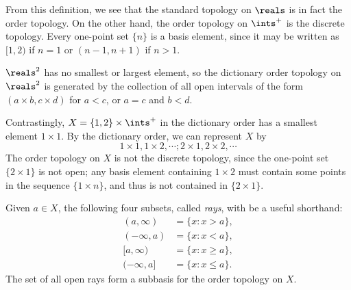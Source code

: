 From this definition, we see that the standard topology on $\reals$ is in fact the order topology. On the other hand, the order topology on $\ints^+$ is the discrete topology. Every one-point set $\{n\}$ is a basis element, since it may be written as $[1, 2)$ if $n = 1$ or $(n-1, n+1)$ if $n>1.$

$\reals^2$ has no smallest or largest element, so the dictionary order topology on $\reals^2$ is generated by the collection of all open intervals of the form $(a \times b, c \times d)$ for $a < c$, or $a = c$ and $b < d$.

Contrastingly, $X = \{1, 2\} \times \ints^+$ in the dictionary order has a smallest element $1 \times 1.$ By the dictionary order, we can represent $X$ by
$$1 \times 1, 1 \times 2, \cdots; 2 \times 1, 2 \times 2, \cdots$$
The order topology on $X$ is not the discrete topology, since the one-point set $\{2\times 1\}$ is not open; any basis element containing $1\times 2$ must contain some points in the sequence $\{1 \times n\}$, and thus is not contained in $\{2\times 1\}$.

Given $a \in X$, the following four subsets, called {\it rays}, with be a useful shorthand:
\begin{align*}
    (a, \infty) &= \{x: x> a\}, \\
    (-\infty, a) &= \{x: x< a\}, \\
    [a, \infty) &= \{x: x\geq a\}, \\
    (-\infty, a] &= \{x: x \leq a\}.
\end{align*}
The set of all open rays form a subbasis for the order topology on $X$.

